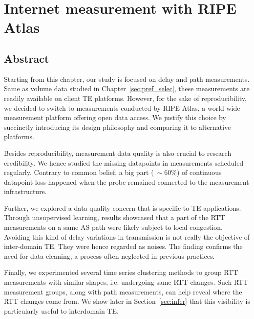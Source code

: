 \chapter{Internet measurement with RIPE Atlas}
\label{sec:ripe_atlas}
\section*{Abstract}

Starting from this chapter, our study is focused on delay and path measurements.
Same as volume data studied in Chapter~\ref{sec:pref_selec}, these measurements are readily available on client TE platforms.
However, for the sake of reproducibility, we decided to switch to measurements conducted by RIPE Atlas, a world-wide measurement platform offering open data access. We justify this choice by succinctly introducing its design philosophy and comparing it to alternative platforms.


Besides reproducibility, measurement data quality is also crucial to research credibility.
We hence studied the missing datapoints in measurements scheduled regularly. 
Contrary to common belief, a big part ($~\sim 60\%$) of continuous datapoint loss happened when the probe remained connected to the measurement infrastructure.

Further, we explored a data quality concern that is specific to TE applications.
Through unsupervised learning, results showcased that a part of the RTT measurements on a same AS path were likely subject to local congestion.
Avoiding this kind of delay variations in transmission is not really the objective of inter-domain TE.
They were hence regarded as noises.
The finding confirms the need for data cleaning, a process often neglected in previous practices.

Finally, we experimented several time series clustering methods to group RTT measurements with similar shapes, i.e. undergoing same RTT changes.
Such RTT measurement groups, along with path measurements, can help reveal where the RTT changes come from.
We show later in Section~\ref{sec:infer} that this visibility is particularly useful to interdomain TE.
\clearpage

